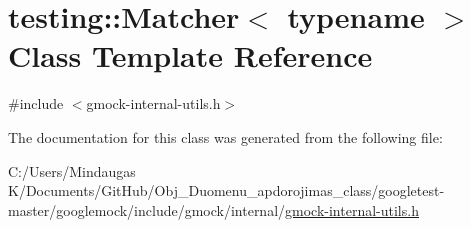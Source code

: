 \hypertarget{classtesting_1_1_matcher}{}\section{testing\+::Matcher$<$ typename $>$ Class Template Reference}
\label{classtesting_1_1_matcher}


{\ttfamily \#include $<$gmock-\/internal-\/utils.\+h$>$}



The documentation for this class was generated from the following file\+:\begin{DoxyCompactItemize}
\item 
C\+:/\+Users/\+Mindaugas K/\+Documents/\+Git\+Hub/\+Obj\+\_\+\+Duomenu\+\_\+apdorojimas\+\_\+class/googletest-\/master/googlemock/include/gmock/internal/\mbox{\hyperlink{googletest-master_2googlemock_2include_2gmock_2internal_2gmock-internal-utils_8h}{gmock-\/internal-\/utils.\+h}}\end{DoxyCompactItemize}
